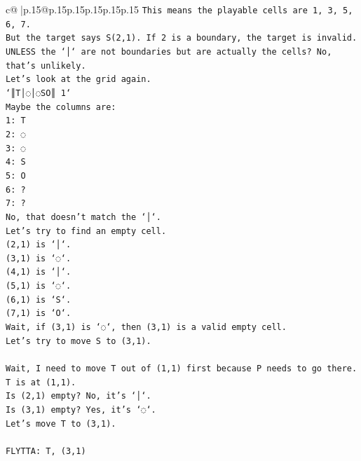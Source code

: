 \documentclass{article}
\begin{document}
{\begin{supertabular}{c@{$\;$}|p{.15\linewidth}@{}p{.15\linewidth}p{.15\linewidth}p{.15\linewidth}p{.15\linewidth}p{.15\linewidth}}
{{{\texttt{This means the playable cells are 1, 3, 5, 6, 7.} \\
\texttt{But the target says S(2,1). If 2 is a boundary, the target is invalid.} \\
\texttt{UNLESS the `│` are not boundaries but are actually the cells? No, that's unlikely.} \\
\texttt{Let's look at the grid again.} \\
\texttt{`║T│◌│◌SO║ 1`} \\
\texttt{Maybe the columns are:} \\
\texttt{1: T} \\
\texttt{2: ◌} \\
\texttt{3: ◌} \\
\texttt{4: S} \\
\texttt{5: O} \\
\texttt{6: ?} \\
\texttt{7: ?} \\
\texttt{No, that doesn't match the `│`.} \\
\texttt{Let's try to find an empty cell.} \\
\texttt{(2,1) is `│`.} \\
\texttt{(3,1) is `◌`.} \\
\texttt{(4,1) is `│`.} \\
\texttt{(5,1) is `◌`.} \\
\texttt{(6,1) is `S`.} \\
\texttt{(7,1) is `O`.} \\
\texttt{Wait, if (3,1) is `◌`, then (3,1) is a valid empty cell.} \\
\texttt{Let's try to move S to (3,1).} \\
\\ 
\texttt{Wait, I need to move T out of (1,1) first because P needs to go there.} \\
\texttt{T is at (1,1).} \\
\texttt{Is (2,1) empty? No, it's `│`.} \\
\texttt{Is (3,1) empty? Yes, it's `◌`.} \\
\texttt{Let's move T to (3,1).} \\
\\ 
\texttt{FLYTTA: T, (3,1)} \\
            }
        }
    }
     \\ \\


\end{supertabular}}
\end{document}
